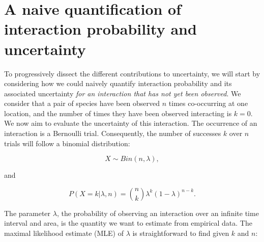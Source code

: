\documentclass[12pt]{article}
\begin{document}
\section*{A naive quantification of interaction probability and uncertainty}



  To progressively dissect the different contributions to uncertainty, we will start by considering how we could naively quantify interaction probability and its associated uncertainty \emph{for an interaction that has not yet been observed}. We consider that a pair of species have been observed $n$ times co-occurring at one location, and the number of times they have been observed interacting is $k = 0$. We now aim to evaluate the uncertainty of this interaction. The occurrence of an interaction is a Bernoulli trial. Consequently, the number of successes $k$ over $n$ trials will follow a binomial distribution: 
      
      \begin{equation}
        X \sim Bin(n,\lambda) ,
      \end{equation}

      \noindent and 

      \begin{equation}
         P(X = k|\lambda,n) = {n \choose k}\lambda^k(1-\lambda)^{n-k} . 
         \label{likelihood}
      \end{equation}

  \noindent The parameter $\lambda$, the probability of observing an interaction over an infinite time interval and area, is the quantity we want to estimate from empirical data. 
  The maximal likelihood estimate (MLE) of $\lambda$ is straightforward to find given $k$ and $n$:
\end{document}
